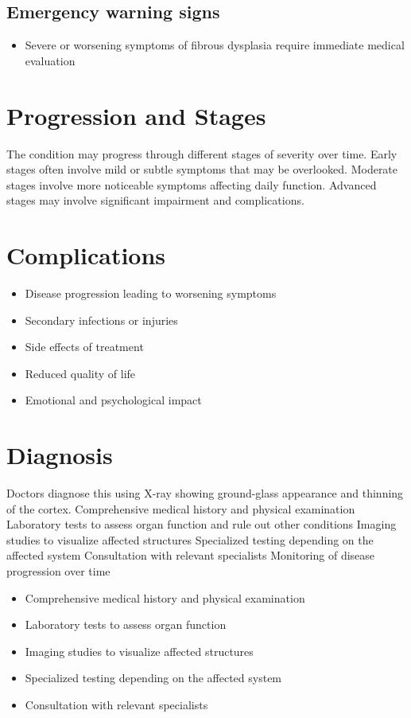 \subsection{Emergency warning signs}
\begin{itemize}[noitemsep]
  \item Severe or worsening symptoms of fibrous dysplasia require immediate medical evaluation
\end{itemize}
\section{Progression and Stages}
The condition may progress through different stages of severity over time. Early stages often involve mild or subtle symptoms that may be overlooked. Moderate stages involve more noticeable symptoms affecting daily function. Advanced stages may involve significant impairment and complications.
\section{Complications}
\begin{itemize}[noitemsep]
  \item Disease progression leading to worsening symptoms
  \item Secondary infections or injuries
  \item Side effects of treatment
  \item Reduced quality of life
  \item Emotional and psychological impact
\end{itemize}
\section{Diagnosis}
Doctors diagnose this using X-ray showing ground-glass appearance and thinning of the cortex. Comprehensive medical history and physical examination Laboratory tests to assess organ function and rule out other conditions Imaging studies to visualize affected structures Specialized testing depending on the affected system Consultation with relevant specialists Monitoring of disease progression over time

\begin{itemize}[noitemsep]
  \item Comprehensive medical history and physical examination
  \item Laboratory tests to assess organ function
  \item Imaging studies to visualize affected structures
  \item Specialized testing depending on the affected system
  \item Consultation with relevant specialists
\end{itemize}

